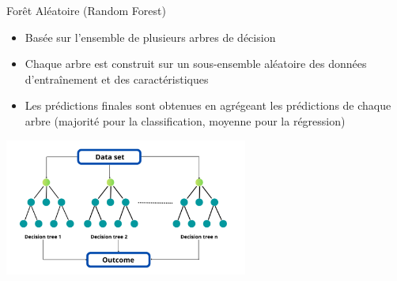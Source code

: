\documentclass{beamer}
\begin{document}
\begin{frame}{Forêt Aléatoire (Random Forest)}
	\begin{itemize}
		\item Basée sur l'ensemble de plusieurs arbres de décision
		\item Chaque arbre est construit sur un sous-ensemble aléatoire des données d'entraînement et des caractéristiques
		\item Les prédictions finales sont obtenues en agrégeant les prédictions de chaque arbre (majorité pour la classification, moyenne pour la régression)
	\end{itemize}
	
	\begin{center}
		\includegraphics[width=0.6\textwidth]{destree.png}
	\end{center}
\end{frame}
\end{document}
